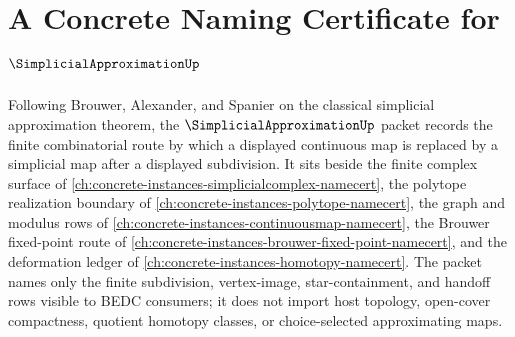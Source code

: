 \chapter{A Concrete Naming Certificate for $\SimplicialApproximationUp$}
\label{ch:concrete-instances-simplicial-approximation-namecert}

Following Brouwer, Alexander, and Spanier on the classical simplicial approximation theorem, the $\SimplicialApproximationUp$ packet records the finite combinatorial route by which a displayed continuous map is replaced by a simplicial map after a displayed subdivision. It sits beside the finite complex surface of \autoref{ch:concrete-instances-simplicialcomplex-namecert}, the polytope realization boundary of \autoref{ch:concrete-instances-polytope-namecert}, the graph and modulus rows of \autoref{ch:concrete-instances-continuousmap-namecert}, the Brouwer fixed-point route of \autoref{ch:concrete-instances-brouwer-fixed-point-namecert}, and the deformation ledger of \autoref{ch:concrete-instances-homotopy-namecert}. The packet names only the finite subdivision, vertex-image, star-containment, and handoff rows visible to BEDC consumers; it does not import host topology, open-cover compactness, quotient homotopy classes, or choice-selected approximating maps.

